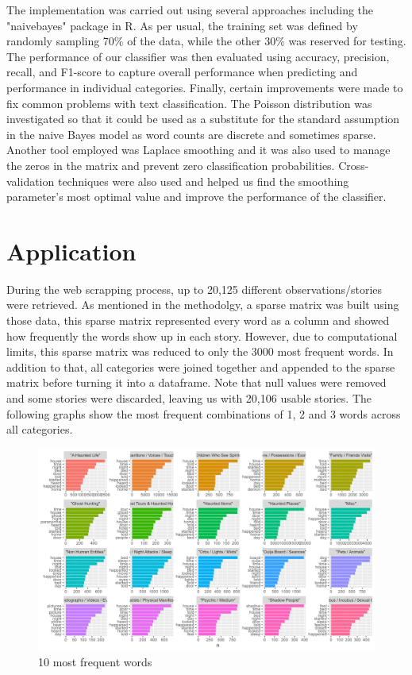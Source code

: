 \documentclass[twocolumn]{article}
\begin{document}
The implementation was carried out using several approaches including the "naivebayes" package in R. As per usual, the training set was defined by randomly sampling 70\% of the data, while the other 30\% was reserved for testing. The performance of our classifier was then evaluated using accuracy, precision, recall, and F1-score to capture overall performance when predicting and performance in individual categories.
Finally, certain improvements were made to fix common problems with text classification.  The Poisson distribution was investigated so that it could be used as a substitute for the standard assumption in the naive Bayes model as word counts are discrete and sometimes sparse. Another tool employed was Laplace smoothing and it was also used to manage the zeros in the matrix and prevent zero classification probabilities. Cross-validation techniques were also used and helped us find the smoothing parameter's most optimal value and improve the performance of the classifier.



\section{Application}
During the web scrapping process, up to 20,125 different observations/stories were retrieved. As mentioned in the methodolgy, a sparse matrix was built using those data, this sparse matrix represented every word as a column and showed how frequently the words show up in each story. However, due to computational limits, this sparse matrix was reduced to only the 3000 most frequent words. In addition to that, all categories were joined together and appended to the sparse matrix before turning it into a dataframe. Note that null values were removed and some stories were discarded, leaving us with 20,106 usable stories. The following graphs show the most frequent combinations of 1, 2 and 3 words across all categories.
\begin{figure}[htbp]
    \centering
    \includegraphics[width=1\columnwidth]{figures/unigrams.png}
    \caption{10 most frequent words}
    \label{unigrams}
\end{figure}
\end{document}
